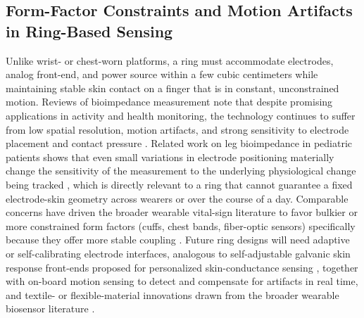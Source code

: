 \subsection{Form-Factor Constraints and Motion Artifacts in Ring-Based Sensing}
Unlike wrist- or chest-worn platforms, a ring must accommodate electrodes, analog front-end, and power source within a few cubic centimeters while maintaining stable skin contact on a finger that is in constant, unconstrained motion. Reviews of bioimpedance measurement note that despite promising applications in activity and health monitoring, the technology continues to suffer from low spatial resolution, motion artifacts, and strong sensitivity to electrode placement and contact pressure \cite{jacobs2026advancing}. Related work on leg bioimpedance in pediatric patients shows that even small variations in electrode positioning materially change the sensitivity of the measurement to the underlying physiological change being tracked \cite{noori2025sensitivity}, which is directly relevant to a ring that cannot guarantee a fixed electrode-skin geometry across wearers or over the course of a day. Comparable concerns have driven the broader wearable vital-sign literature to favor bulkier or more constrained form factors (cuffs, chest bands, fiber-optic sensors) specifically because they offer more stable coupling \cite{sel2023continuous,lindstrom2025wearable,mayoral2021fiber,dias2018wearable}. Future ring designs will need adaptive or self-calibrating electrode interfaces, analogous to self-adjustable galvanic skin response front-ends proposed for personalized skin-conductance sensing \cite{miranda2023self}, together with on-board motion sensing to detect and compensate for artifacts in real time, and textile- or flexible-material innovations drawn from the broader wearable biosensor literature \cite{li2023advanced}.


